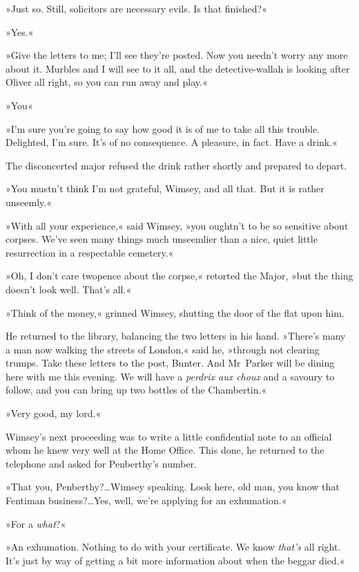 »Just so. Still, solicitors are necessary evils. Is that finished?«

»Yes.«

»Give the letters to me; I'll see they're posted. Now you needn't worry any more about it. Murbles and I will see to it all, and the detective-wallah is looking after Oliver all right, so you can run away and play.«

»You\longdash«

»I'm sure you're going to say how good it is of me to take all this trouble. Delighted, I'm sure. It's of no consequence. A pleasure, in fact. Have a drink.«

The disconcerted major refused the drink rather shortly and prepared to depart.

»You mustn't think I'm not grateful, Wimsey, and all that. But it is rather unseemly.«

»With all your experience,« said Wimsey, »you oughtn't to be so sensitive about corpses. We've seen many things much unseemlier than a nice, quiet little resurrection in a respectable cemetery.«

»Oh, I don't care twopence about the corpse,« retorted the Major, »but the thing doesn't look well. That's all.«

»Think of the money,« grinned Wimsey, shutting the door of the flat upon him.

He returned to the library, balancing the two letters in his hand. »There's many a man now walking the streets of London,« said he, »through not clearing trumps. Take these letters to the post, Bunter. And Mr~Parker will be dining here with me this evening. We will have a \textit{perdrix aux choux} and a savoury to follow, and you can bring up two bottles of the Chambertin.«

»Very good, my lord.«

Wimsey's next proceeding was to write a little confidential note to an official whom he knew very well at the Home Office. This done, he returned to the telephone and asked for Penberthy's number.

»That you, Penberthy?\dots Wimsey speaking\textellipsis. Look here, old man, you know that Fentiman business?\dots Yes, well, we're applying for an exhumation.«

»For a \textit{what}?«

»An exhumation. Nothing to do with your certificate. We know \textit{that's} all right. It's just by way of getting a bit more information about when the beggar died.«

